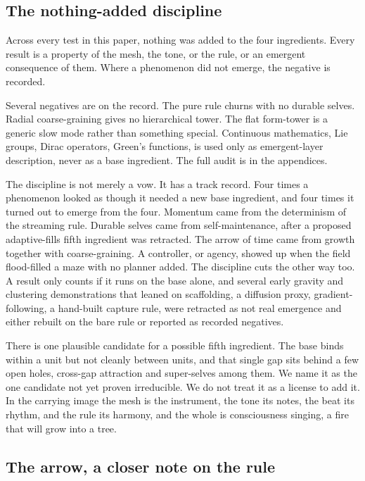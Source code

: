 \subsection{The nothing-added discipline}

\begin{principle}
\label{prin:nothing-added}
Across every test in this paper, nothing was added to the four ingredients. Every result is a property of the
mesh, the tone, or the rule, or an emergent consequence of them. Where a phenomenon did not emerge, the negative
is recorded.
\end{principle}

Several negatives are on the record. The pure rule churns with no durable selves. Radial coarse-graining gives no
hierarchical tower. The flat form-tower is a generic slow mode rather than something special. Continuous
mathematics, Lie groups, Dirac operators, Green's functions, is used only as emergent-layer description, never as
a base ingredient. The full audit is in the appendices.

The discipline is not merely a vow. It has a track record. Four times a phenomenon looked as though it needed a
new base ingredient, and four times it turned out to emerge from the four. Momentum came from the determinism of
the streaming rule. Durable selves came from self-maintenance, after a proposed adaptive-fills fifth ingredient
was retracted. The arrow of time came from growth together with coarse-graining. A controller, or agency, showed
up when the field flood-filled a maze with no planner added. The discipline cuts the other way too. A result only
counts if it runs on the base alone, and several early gravity and clustering demonstrations that leaned on
scaffolding, a diffusion proxy, gradient-following, a hand-built capture rule, were retracted as not real
emergence and either rebuilt on the bare rule or reported as recorded negatives.

There is one plausible candidate for a possible fifth ingredient. The base binds within a unit but not cleanly
between units, and that single gap sits behind a few open holes, cross-gap attraction and super-selves among
them. We name it as the one candidate not yet proven irreducible. We do not treat it as a license to add it. In
the carrying image the mesh is the instrument, the tone its notes, the beat its rhythm, and the rule its harmony,
and the whole is consciousness singing, a fire that will grow into a tree.

\subsection{The arrow, a closer note on the rule}

